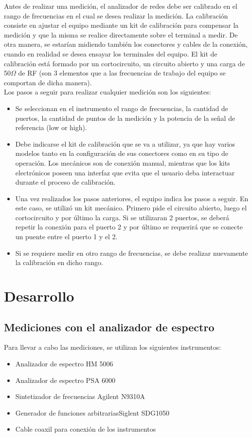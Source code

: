 \documentclass[a4paper,10pt]{article}
\begin{document}
	\indent Antes de realizar una medici\'on, el analizador de redes debe ser 
	calibrado en el rango de frecuencias en el cual se desea realizar la 
	medici\'on. La calibraci\'on consiste en ajustar el equipo mediante un kit de 
	calibraci\'on para compensar la medici\'on y que la misma se realice 
	directamente sobre el terminal a medir. De otra manera, se estar\'ian midiendo
	tambi\'en los conectores y cables de la conexi\'on, cuando en realidad se desea 
	ensayar los terminales del equipo. El kit de calibraci\'on est\'a formado por un
	cortocircuito, un circuito abierto y una carga de 50$\Omega$ de RF (son 3 
	elementos que a las frecuencias de trabajo del equipo se comportan de dicha 
	manera). \\
	\indent Los pasos a seguir para realizar cualquier medici\'on son los 
	siguientes:
	
	\begin{itemize}
		\item Se seleccionan en el instrumento el rango de frecuencias, la 
		cantidad de puertos, la cantidad de puntos de la medici\'on y la potencia 
		de la se\~nal de referencia (low or high). 
		\item Debe indicarse el kit de calibraci\'on que se va a utilizar, ya que
		hay varios modelos tanto en la configuraci\'on de sus conectores como en 
		su tipo de operaci\'on. Los mec\'anicos son de conexi\'on manual, mientras que
		los kits electr\'onicos poseen una interfaz que evita que el usuario deba 
		interactuar durante el proceso de calibraci\'on. 
		\item Una vez realizados los pasos anteriores, el equipo indica los 
		pasos a seguir. En este caso, se utiliz\'o un kit mec\'anico. Primero pide 
		el circuito abierto, luego el cortocircuito y por \'ultimo la carga. Si se
		utilizaran 2 puertos, se deber\'a repetir la conexi\'on para el puerto 2 y 
		por \'ultimo se requerir\'a que se conecte un puente entre el puerto 1 y el 
		2. 
		\item Si se requiere medir en otro rango de frecuencias, se debe 
		realizar nuevamente la calibraci\'on en dicho rango. 
	\end{itemize}
	
\section{Desarrollo}
	\subsection{Mediciones con el analizador de espectro}
\indent Para llevar a cabo las mediciones, se utilizan los siguientes
		instrumentos:
		\begin{itemize}
			\item Analizador de espectro HM 5006
			\item Analizador de espectro PSA 6000
			\item Sintetizador de frecuencias Agilent N9310A
			\item Generador de funciones arbitrariasSiglent SDG1050
			\item Cable coaxil para conexi\'on de los instrumentos
		\end{itemize}	
\end{document}
